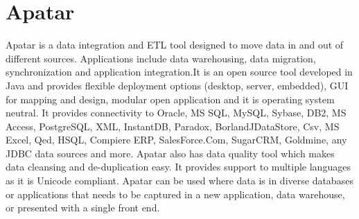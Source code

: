 \section{Apatar}
Apatar \cite{hid-sp18-402-www-apatar} is a data integration and ETL
tool designed to move data in and out of different
sources. Applications include data warehousing, data migration,
synchronization and application integration.It is an open source tool
developed in Java and provides flexible deployment options (desktop,
server, embedded), GUI for mapping and design, modular open
application and it is operating system neutral. It provides
connectivity to Oracle, MS SQL, MySQL, Sybase, DB2, MS Access,
PostgreSQL, XML, InstantDB, Paradox, BorlandJDataStore, Csv, MS Excel,
Qed, HSQL, Compiere ERP, SalesForce.Com, SugarCRM, Goldmine, any JDBC
data sources and more. Apatar also has data quality tool which makes
data cleansing and de-duplication easy. It provides support to
multiple languages as it is Unicode compliant. Apatar can be used
where data is in diverse databases or applications that needs to be
captured in a new application, data warehouse, or presented with a
single front end.
